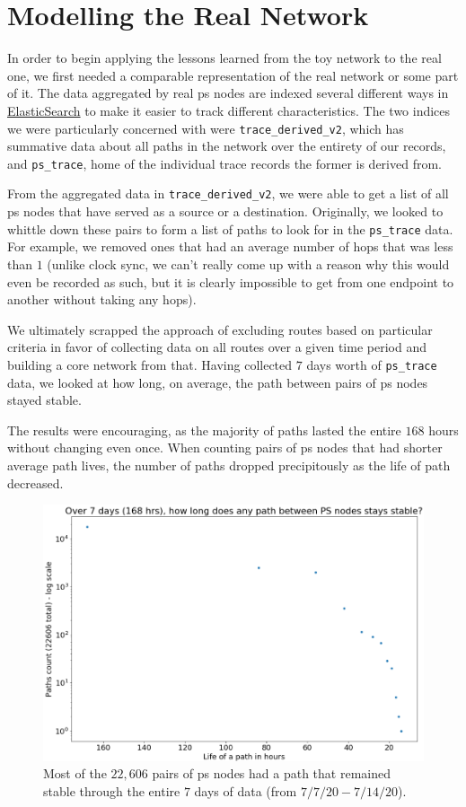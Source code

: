 \documentclass{finalreport}
\begin{document}
\section{Modelling the Real Network}

In order to begin applying the lessons learned from the toy network to the real one, we first needed a comparable representation of the real network or some part of it. The data aggregated by real \gls{ps} nodes are indexed several different ways in \hyperref[es]{ElasticSearch} to make it easier to track different characteristics. The two indices we were particularly concerned with were \texttt{trace\_derived\_v2}, which has summative data about all paths in the network over the entirety of our records, and \texttt{ps\_trace}, home of the individual \gls{trace} records the former is derived from.

From the aggregated data in \texttt{trace\_derived\_v2}, we were able to get a list of all \gls{ps} nodes that have served as a source or a destination. Originally, we looked to whittle down these pairs to form a list of paths to look for in the \texttt{ps\_trace} data. For example, we removed ones that had an average number of hops that was less than $1$ (unlike clock sync, we can't really come up with a reason why this would even be recorded as such, but it is clearly impossible to get from one endpoint to another without taking any hops).

We ultimately scrapped the approach of excluding routes based on particular criteria in favor of collecting data on all routes over a given time period and building a core network from that. Having collected $7$ days worth of \texttt{ps\_trace} data, we looked at how long, on average, the path between pairs of \gls{ps} nodes stayed stable. 

The results were encouraging, as the majority of paths lasted the entire $168$ hours without changing even once. When counting pairs of \gls{ps} nodes that had shorter average path lives, the number of paths dropped precipitously as the life of path decreased.

\begin{figure}[!ht]
\centering
\includegraphics[width=.85\linewidth]{final/pathlife.png}
\caption{Most of the $22,606$ pairs of \gls{ps} nodes had a path that remained stable through the entire $7$ days of data (from $7/7/20-7/14/20$).}
\end{figure}
\end{document}
